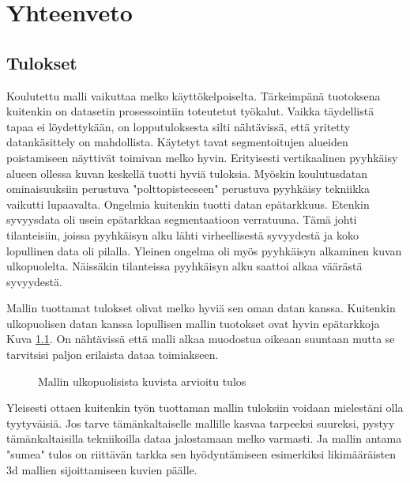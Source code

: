 \chapter{Yhteenveto}%
\label{ch:yhteenveto}

\section{Tulokset}

Koulutettu malli vaikuttaa melko käyttökelpoiselta. Tärkeimpänä tuotoksena kuitenkin on datasetin prosessointiin toteutetut työkalut.
Vaikka täydellistä tapaa ei löydettykään, on lopputuloksesta silti nähtävissä, että yritetty datankäsittely on mahdollista.
Käytetyt tavat segmentoitujen alueiden poistamiseen näyttivät toimivan melko hyvin.
Erityisesti vertikaalinen pyyhkäisy alueen ollessa kuvan keskellä tuotti hyviä tuloksia.
Myöskin koulutusdatan ominaisuuksiin perustuva "polttopisteeseen" perustuva pyyhkäisy tekniikka vaikutti lupaavalta.
Ongelmia kuitenkin tuotti datan epätarkkuus.
Etenkin syvyysdata oli usein epätarkkaa segmentaatioon verratuuna. Tämä johti tilanteisiin, joissa pyyhkäisyn alku lähti virheellisestä syvyydestä ja koko lopullinen data oli pilalla. Yleinen ongelma oli myös pyyhkäisyn alkaminen kuvan ulkopuolelta.
Näissäkin tilanteissa pyyhkäisyn alku saattoi alkaa väärästä syvyydestä.

Mallin tuottamat tulokset olivat melko hyviä sen oman datan kanssa.
Kuitenkin ulkopuolisen datan kanssa lopullisen mallin tuotokset ovat hyvin epätarkkoja Kuva \ref{fig:ulkoinen}.
On nähtävissä että malli alkaa muodostua oikeaan suuntaan mutta se tarvitsisi paljon erilaista dataa toimiakseen.

\begin{figure}[h]
\centering
{}
\caption{Mallin ulkopuolisista kuvista arvioitu tulos}
\label{fig:ulkoinen}
\end{figure}

Yleisesti ottaen kuitenkin työn tuottaman mallin tuloksiin voidaan mielestäni olla tyytyväisiä.
Jos tarve tämänkaltaiselle mallille kasvaa tarpeeksi suureksi, pystyy tämänkaltaisilla tekniikoilla dataa jalostamaan melko varmasti.
Ja mallin antama "sumea" tulos on riittävän tarkka sen hyödyntämiseen esimerkiksi likimääräisten 3d mallien sijoittamiseen kuvien päälle.

